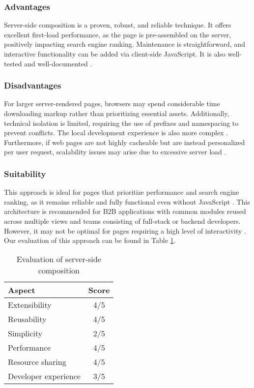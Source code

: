\subsubsection{Advantages}
Server-side composition is a proven, robust, and reliable technique. It offers excellent first-load performance, as the page is pre-assembled on the server, positively impacting search engine ranking. Maintenance is straightforward, and interactive functionality can be added via client-side JavaScript. It is also well-tested and well-documented \cite{Geers, MezzaliraBuildingMf}.

\subsubsection{Disadvantages}
For larger server-rendered pages, browsers may spend considerable time downloading markup rather than prioritizing essential assets. Additionally, technical isolation is limited, requiring the use of prefixes and namespacing to prevent conflicts. The local development experience is also more complex \cite{Geers}. Furthermore, if web pages are not highly cacheable but are instead personalized per user request, scalability issues may arise due to excessive server load \cite{Peltonen}.

\subsubsection{Suitability}
This approach is ideal for pages that prioritize performance and search engine ranking, as it remains reliable and fully functional even without JavaScript \cite{Geers}. This architecture is recommended for B2B applications with common modules reused across multiple views and teams consisting of full-stack or backend developers. However, it may not be optimal for pages requiring a high level of interactivity \cite{MezzaliraBuildingMf}. Our evaluation of this approach can be found in Table \ref{table:ssi-evaluation}.
\begin{table}[h]
  \centering
  \begin{tabular}{|p{4cm}|c|}
     \hline
        \textbf{Aspect} & \textbf{Score} \\
     \hline
        Extensibility & 4/5 \\
     \hline
        Reusability & 4/5 \\
     \hline
        Simplicity & 2/5 \\
     \hline
        Performance & 4/5 \\
     \hline
        Resource sharing & 4/5 \\
     \hline
        Developer experience & 3/5 \\
     \hline
  \end{tabular}
  \caption{Evaluation of server-side composition}
  \label{table:ssi-evaluation}
\end{table}


